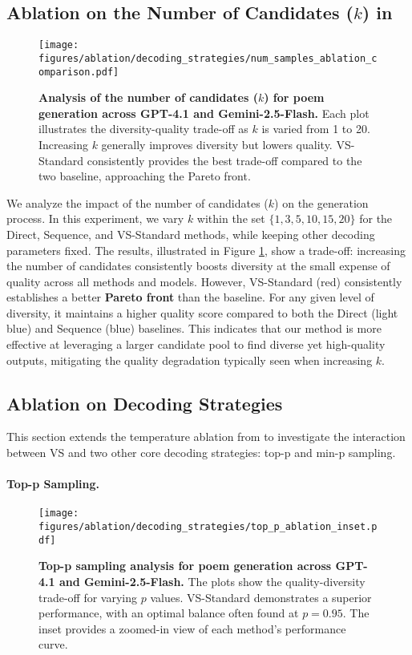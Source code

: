 \subsection{Ablation on the Number of Candidates ($k$) in \ours}\label{sec:ablation_number_candidates}
\begin{figure}[ht]
    \centering
    \texttt{[image: figures/ablation/decoding\_strategies/num\_samples\_ablation\_comparison.pdf]}
    \caption{\textbf{Analysis of the number of candidates ($k$) for poem generation across GPT-4.1 and Gemini-2.5-Flash.} Each plot illustrates the diversity-quality trade-off as $k$ is varied from 1 to 20. Increasing $k$ generally improves diversity but lowers quality. VS-Standard consistently provides the best trade-off compared to the two baseline, approaching the Pareto front.}
    \label{fig:num_candidates_ablation}
\end{figure}

We analyze the impact of the number of candidates ($k$) on the generation process. In this experiment, we vary $k$ within the set $\{1, 3, 5, 10, 15, 20\}$ for the Direct, Sequence, and VS-Standard methods, while keeping other decoding parameters fixed. The results, illustrated in Figure \ref{fig:num_candidates_ablation}, show a trade-off: {increasing the number of candidates consistently boosts diversity at the small expense of quality across all methods and models}. However, {VS-Standard (red) consistently establishes a better \textbf{Pareto front} than the baseline}. For any given level of diversity, it maintains a higher quality score compared to both the Direct (light blue) and Sequence (blue) baselines. This indicates that our method is more effective at leveraging a larger candidate pool to find diverse yet high-quality outputs, mitigating the quality degradation typically seen when increasing $k$.

\subsection{Ablation on Decoding Strategies}\label{sec:ablation_decoding_strategies}
This section extends the temperature ablation from  to investigate the interaction between VS and two other core decoding strategies: top-p and min-p sampling.

\paragraph{Top-p Sampling.}
\begin{figure}[ht]
    \centering
    \texttt{[image: figures/ablation/decoding\_strategies/top\_p\_ablation\_inset.pdf]}
    \caption{\textbf{Top-p sampling analysis for poem generation across GPT-4.1 and Gemini-2.5-Flash.} The plots show the quality-diversity trade-off for varying $p$ values. VS-Standard demonstrates a superior performance, with an optimal balance often found at $p=0.95$. The inset provides a zoomed-in view of each method's performance curve.}
    \label{fig:top_p_ablation}
\end{figure}

